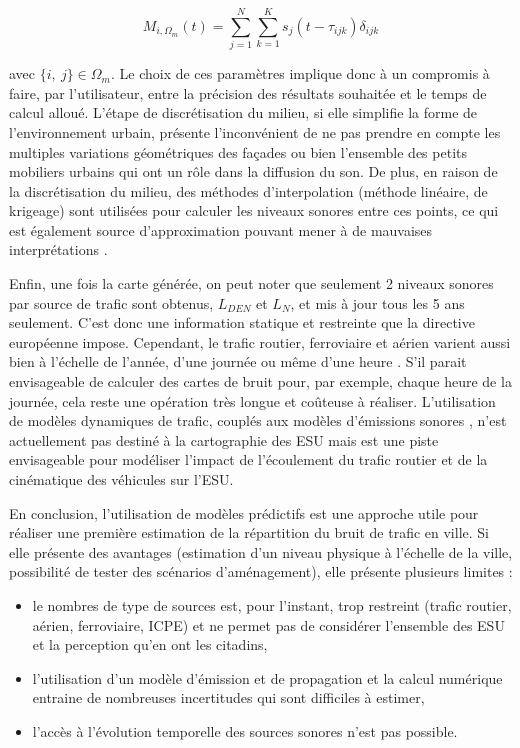 \begin{equation}
 M_{i,\Omega_m}(t)= \sum_{j = 1}^{N} \sum_{k = 1}^{K} s_{j}(t-\tau_{ijk}) \delta_{ijk}
 \end{equation}


avec $\lbrace i,~j \rbrace \in \Omega_m$. Le choix de ces paramètres implique donc à un compromis à faire, par l'utilisateur, entre la précision des résultats souhaitée et le temps de calcul alloué. 
L'étape de discrétisation du milieu, si elle simplifie la forme de l'environnement urbain, présente l'inconvénient de ne pas prendre en compte les multiples variations géométriques des façades ou bien l'ensemble des petits mobiliers urbains qui ont un rôle dans la diffusion du son.
De plus, en raison de la discrétisation du milieu, des méthodes d'interpolation (méthode linéaire, de krigeage) sont utilisées pour calculer les niveaux sonores entre ces points, ce qui est également source d'approximation pouvant mener à de mauvaises interprétations \cite{van_leeuwen_noise_2015}.

Enfin, une fois la carte générée, on peut noter que seulement 2 niveaux sonores par source de trafic sont obtenus, $L_{DEN}$ et $L_N$, et mis à jour tous les 5 ans seulement. C'est donc une information statique et restreinte que la directive européenne impose. Cependant, le trafic routier, ferroviaire et aérien varient aussi bien à l'échelle de l'année, d'une journée ou même d'une heure \cite{lv2015traffic}. S'il parait envisageable de calculer des cartes de bruit pour, par exemple, chaque heure de la journée, cela reste une opération très longue et coûteuse à réaliser.
L'utilisation de modèles dynamiques de trafic, couplés aux modèles d'émissions sonores \cite{can2010traffic}, n'est actuellement pas destiné à la cartographie des ESU mais est une piste envisageable pour modéliser l'impact de l'écoulement du trafic routier et de la cinématique des véhicules sur l'ESU.

En conclusion, l'utilisation de modèles prédictifs est une approche utile pour réaliser une première estimation de la répartition du bruit de trafic en ville. Si elle présente des avantages (estimation d'un niveau physique à l'échelle de la ville, possibilité de tester des scénarios d'aménagement), elle présente plusieurs limites :

\begin{itemize}
\item le nombres de type de sources est, pour l'instant, trop restreint (trafic routier, aérien, ferroviaire, ICPE) et ne permet pas de considérer l'ensemble des ESU et la perception qu'en ont les citadins,
\item l'utilisation d'un modèle d'émission et de propagation et la calcul numérique entraine de nombreuses incertitudes qui sont difficiles à estimer,
\item l'accès à l'évolution temporelle des sources sonores n'est pas possible.
\end{itemize}


